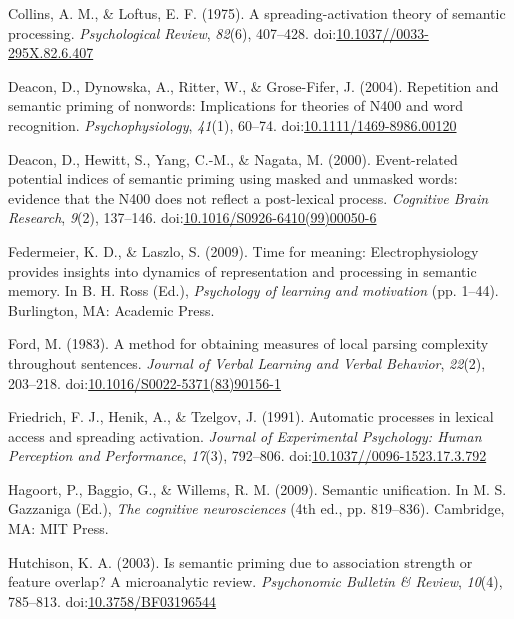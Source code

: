 \documentclass[english,man]{apa6}
\theoremstyle{definition}
\theoremstyle{definition}
\theoremstyle{definition}
\theoremstyle{remark}
\begin{document}
\hypertarget{ref-Collins1975}{}
Collins, A. M., \& Loftus, E. F. (1975). A spreading-activation theory
of semantic processing. \emph{Psychological Review}, \emph{82}(6),
407--428.
doi:\href{https://doi.org/10.1037//0033-295X.82.6.407}{10.1037//0033-295X.82.6.407}

\hypertarget{ref-Deacon2004}{}
Deacon, D., Dynowska, A., Ritter, W., \& Grose-Fifer, J. (2004).
Repetition and semantic priming of nonwords: Implications for theories
of N400 and word recognition. \emph{Psychophysiology}, \emph{41}(1),
60--74.
doi:\href{https://doi.org/10.1111/1469-8986.00120}{10.1111/1469-8986.00120}

\hypertarget{ref-Deacon2000}{}
Deacon, D., Hewitt, S., Yang, C.-M., \& Nagata, M. (2000). Event-related
potential indices of semantic priming using masked and unmasked words:
evidence that the N400 does not reflect a post-lexical process.
\emph{Cognitive Brain Research}, \emph{9}(2), 137--146.
doi:\href{https://doi.org/10.1016/S0926-6410(99)00050-6}{10.1016/S0926-6410(99)00050-6}

\hypertarget{ref-Federmeier2009}{}
Federmeier, K. D., \& Laszlo, S. (2009). Time for meaning:
Electrophysiology provides insights into dynamics of representation and
processing in semantic memory. In B. H. Ross (Ed.), \emph{Psychology of
learning and motivation} (pp. 1--44). Burlington, MA: Academic Press.

\hypertarget{ref-Ford1983}{}
Ford, M. (1983). A method for obtaining measures of local parsing
complexity throughout sentences. \emph{Journal of Verbal Learning and
Verbal Behavior}, \emph{22}(2), 203--218.
doi:\href{https://doi.org/10.1016/S0022-5371(83)90156-1}{10.1016/S0022-5371(83)90156-1}

\hypertarget{ref-Friedrich1991}{}
Friedrich, F. J., Henik, A., \& Tzelgov, J. (1991). Automatic processes
in lexical access and spreading activation. \emph{Journal of
Experimental Psychology: Human Perception and Performance},
\emph{17}(3), 792--806.
doi:\href{https://doi.org/10.1037//0096-1523.17.3.792}{10.1037//0096-1523.17.3.792}

\hypertarget{ref-Hagoort2009}{}
Hagoort, P., Baggio, G., \& Willems, R. M. (2009). Semantic unification.
In M. S. Gazzaniga (Ed.), \emph{The cognitive neurosciences} (4th ed.,
pp. 819--836). Cambridge, MA: MIT Press.

\hypertarget{ref-Hutchison2003}{}
Hutchison, K. A. (2003). Is semantic priming due to association strength
or feature overlap? A microanalytic review. \emph{Psychonomic Bulletin
\& Review}, \emph{10}(4), 785--813.
doi:\href{https://doi.org/10.3758/BF03196544}{10.3758/BF03196544}
\end{document}
